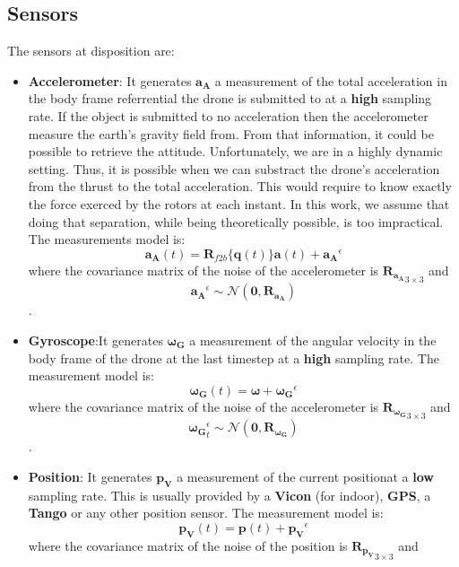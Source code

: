 \documentclass[12pt,]{article}
\begin{document}
\subsection{Sensors}\label{sensors}

The sensors at disposition are:

\begin{itemize}
\item
  \textbf{Accelerometer}: It generates \(\mathbf{a_A}\) a measurement of
  the total acceleration in the body frame referrential the drone is
  submitted to at a \textbf{high} sampling rate. If the object is
  submitted to no acceleration then the accelerometer measure the
  earth's gravity field from. From that information, it could be
  possible to retrieve the attitude. Unfortunately, we are in a highly
  dynamic setting. Thus, it is possible when we can substract the
  drone's acceleration from the thrust to the total acceleration. This
  would require to know exactly the force exerced by the rotors at each
  instant. In this work, we assume that doing that separation, while
  being theoretically possible, is too impractical. The measurements
  model is:
  \[\mathbf{a_A}(t) = \mathbf{R}_{f2b}\{\mathbf{q}(t)\}\mathbf{a}(t) + \mathbf{a_A}^\epsilon\]
  where the covariance matrix of the noise of the accelerometer is
  \({\mathbf{R}_{\mathbf{a_A}}}_{3 \times 3}\) and
  \[\mathbf{a_A}^\epsilon \sim \mathcal{N}(\mathbf{0}, \mathbf{R}_{\mathbf{a_A}})\].
\item
  \textbf{Gyroscope}:It generates \(\mathbf{\boldsymbol{\omega}_G}\) a
  measurement of the angular velocity in the body frame of the drone at
  the last timestep at a \textbf{high} sampling rate. The measurement
  model is:
  \[\mathbf{\boldsymbol{\omega}_G}(t) = \boldsymbol{\omega} + \mathbf{\boldsymbol{\omega}_G}^\epsilon\]
  where the covariance matrix of the noise of the accelerometer is
  \({\mathbf{R}_{\mathbf{\boldsymbol{\omega}_G}}}_{3 \times 3}\) and
  \[\mathbf{\boldsymbol{\omega}_G}^\epsilon_t \sim \mathcal{N}(\mathbf{0}, \mathbf{R}_{\mathbf{\boldsymbol{\omega}_G}})\].
\item
  \textbf{Position}: It generates \(\mathbf{p_V}\) a measurement of the
  current positionat a \textbf{low} sampling rate. This is usually
  provided by a \textbf{Vicon} (for indoor), \textbf{GPS}, a
  \textbf{Tango} or any other position sensor. The measurement model is:
  \[\mathbf{p_V}(t) = \mathbf{p}(t) + \mathbf{p_V}^\epsilon\] where the
  covariance matrix of the noise of the position is
  \({\mathbf{R}_{\mathbf{p_V}}}_{3 \times 3}\) and

\end{itemize}
\end{document}
